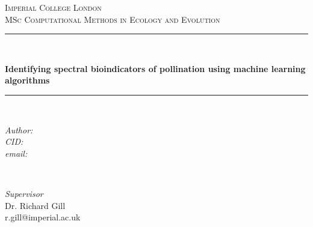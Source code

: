
\begin{titlepage} 
	\newcommand{\HRule}{\rule{\linewidth}{0.5mm}} 
	
	\center %
	
	
	\textsc{\LARGE Imperial College London}\\[2.5cm] 

	\textsc{\Large MSc Computational Methods in Ecology and Evolution}\\[2.5cm]
	

	
	\HRule\\[0.6cm]
	
	{\huge\bfseries Identifying spectral bioindicators of pollination using machine learning algorithms \par}
	
	\HRule\\[2.5cm]
	
	
	\begin{minipage}{0.4\textwidth}
		\begin{flushleft}
			\large
			\textit{Author: }
			\\
			\textit{CID: }
			\\
			\textit{email: }
		\end{flushleft}
	\end{minipage}
	~
	\begin{minipage}{0.4\textwidth}
		\begin{flushright}
			\large
			\textit{Supervisor}\\
			Dr. Richard Gill\\%
			r.gill@imperial.ac.uk
		\end{flushright}
	\end{minipage}
	
	

\end{titlepage}
